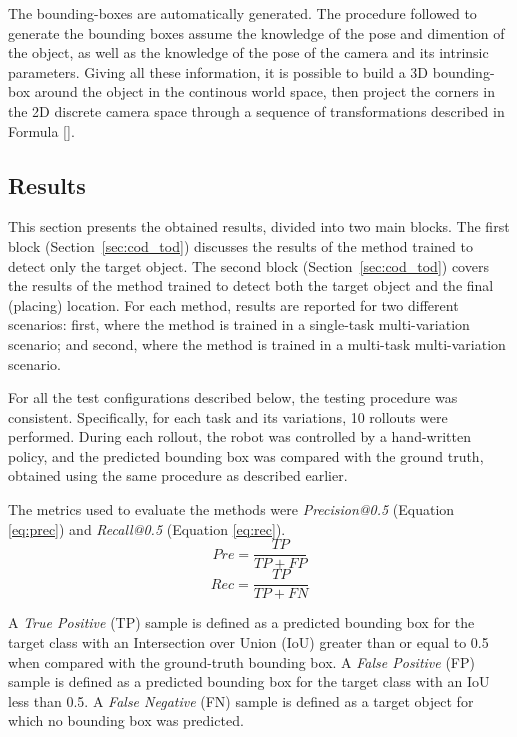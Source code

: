 The bounding-boxes are automatically generated. The procedure followed to generate the bounding boxes assume the knowledge of the pose and dimention of the object, as well as the knowledge of the pose of the camera and its intrinsic parameters. Giving all these information, it is possible to build a 3D bounding-box around the object in the continous world space, then project the corners in the 2D discrete camera space through a sequence of transformations described in Formula \ref{}.
\begin{equation}
\end{equation}
\subsection{Results}
\label{sec:cod_results}
This section presents the obtained results, divided into two main blocks. The first block (Section~\ref{sec:cod_tod}) discusses the results of the method trained to detect only the target object. The second block (Section~\ref{sec:cod_tod}) covers the results of the method trained to detect both the target object and the final (placing) location. For each method, results are reported for two different scenarios: first, where the method is trained in a single-task multi-variation scenario; and second, where the method is trained in a multi-task multi-variation scenario.

For all the test configurations described below, the testing procedure was consistent. Specifically, for each task and its variations, 10 rollouts were performed. During each rollout, the robot was controlled by a hand-written policy, and the predicted bounding box was compared with the ground truth, obtained using the same procedure as described earlier.

The metrics used to evaluate the methods were \textit{Precision@0.5} (Equation \ref{eq:prec}) and \textit{Recall@0.5} (Equation \ref{eq:rec}).
\begin{equation}
    \label{eq:prec}
    Pre = \frac{TP}{TP+FP}
\end{equation} 
\begin{equation}
    \label{eq:rec}
    Rec = \frac{TP}{TP+FN}
\end{equation}

A \textit{True Positive} (TP) sample is defined as a predicted bounding box for the target class with an Intersection over Union (IoU) greater than or equal to 0.5 when compared with the ground-truth bounding box. A \textit{False Positive} (FP) sample is defined as a predicted bounding box for the target class with an IoU less than 0.5. A \textit{False Negative} (FN) sample is defined as a target object for which no bounding box was predicted.

